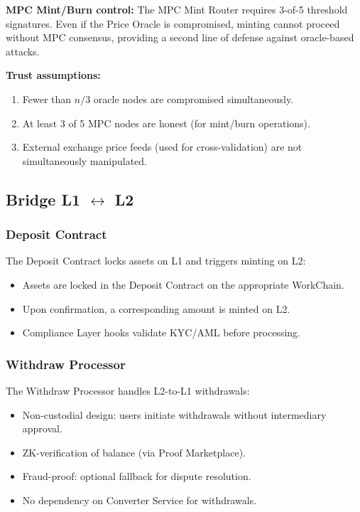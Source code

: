 \documentclass[12pt,a4paper]{article}
\theoremstyle{definition}
\theoremstyle{remark}
\begin{document}
\textbf{MPC Mint/Burn control:} The MPC Mint Router requires 3-of-5 threshold signatures. Even if the Price Oracle is compromised, minting cannot proceed without MPC consensus, providing a second line of defense against oracle-based attacks.

\textbf{Trust assumptions:}
\begin{enumerate}[nosep]
    \item Fewer than $n/3$ oracle nodes are compromised simultaneously.
    \item At least 3 of 5 MPC nodes are honest (for mint/burn operations).
    \item External exchange price feeds (used for cross-validation) are not simultaneously manipulated.
\end{enumerate}

\subsection{Bridge L1 $\leftrightarrow$ L2}
\label{sec:bridge-arch}

\subsubsection{Deposit Contract}

The Deposit Contract locks assets on L1 and triggers minting on L2:
\begin{itemize}[nosep]
    \item Assets are locked in the Deposit Contract on the appropriate WorkChain.
    \item Upon confirmation, a corresponding amount is minted on L2.
    \item Compliance Layer hooks validate KYC/AML before processing.
\end{itemize}

\subsubsection{Withdraw Processor}

The Withdraw Processor handles L2-to-L1 withdrawals:
\begin{itemize}[nosep]
    \item Non-custodial design: users initiate withdrawals without intermediary approval.
    \item ZK-verification of balance (via Proof Marketplace).
    \item Fraud-proof: optional fallback for dispute resolution.
    \item No dependency on Converter Service for withdrawals.
\end{itemize}
\end{document}
